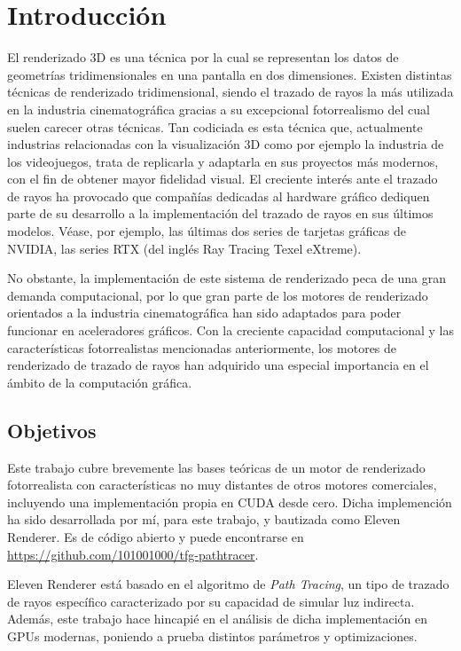 \chapter{Introducción}
\label{chap:1}	

El renderizado 3D es una técnica por la cual se representan los datos de geometrías tridimensionales en una pantalla en dos dimensiones. Existen distintas técnicas de renderizado tridimensional, siendo el trazado de rayos la más utilizada en la industria cinematográfica gracias a su excepcional fotorrealismo del cual suelen carecer otras técnicas. Tan codiciada es esta técnica que, actualmente industrias relacionadas con la visualización 3D como por ejemplo la industria de los videojuegos, trata de replicarla y adaptarla en sus proyectos más modernos, con el fin de obtener mayor fidelidad visual.
El creciente interés ante el trazado de rayos ha provocado que compañías dedicadas al hardware gráfico dediquen parte de su desarrollo a la implementación del trazado de rayos en sus últimos modelos. Véase, por ejemplo, las últimas dos series de tarjetas gráficas de NVIDIA, las series RTX (del inglés Ray Tracing Texel eXtreme).

No obstante, la implementación de este sistema de renderizado peca de una gran demanda computacional, por lo que gran parte de los motores de renderizado orientados a la industria cinematográfica han sido adaptados para poder funcionar en aceleradores gráficos. Con la creciente capacidad computacional y las características fotorrealistas mencionadas anteriormente, los motores de renderizado de trazado de rayos han adquirido una especial importancia en el ámbito de la computación gráfica.

\section{Objetivos}
	
Este trabajo cubre brevemente las bases teóricas de un motor de renderizado fotorrealista con características no muy distantes de otros motores comerciales, incluyendo una implementación propia en CUDA desde cero. Dicha implemención ha sido desarrollada por mí, para este trabajo, y bautizada como Eleven Renderer. Es de código abierto y puede encontrarse en \url{https://github.com/101001000/tfg-pathtracer}.

Eleven Renderer está basado en el algoritmo de \emph{Path Tracing}, un tipo de trazado de rayos específico caracterizado por su capacidad de simular luz indirecta. Además, este trabajo hace hincapié en el análisis de dicha implementación en GPUs modernas, poniendo a prueba distintos parámetros y optimizaciones.
	
